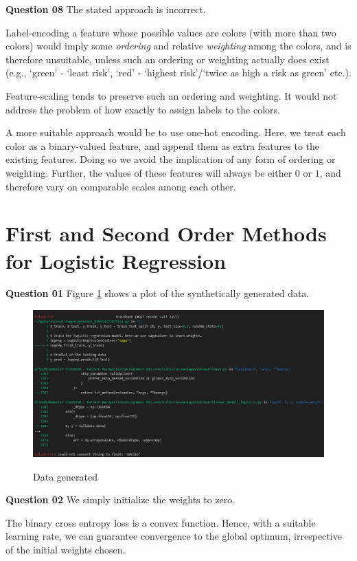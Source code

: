 \documentclass{article}[a4paper]
\begin{document}
	\textbf{Question 08} The stated approach is incorrect.
	
	Label-encoding a feature whose possible values are colors (with more than two colors) would imply some \textit{ordering} and relative \textit{weighting} among the colors, and is therefore unsuitable, unless such an ordering or weighting actually does exist (e.g., `green' - `least risk', `red' - `highest risk'/`twice as high a risk as green' etc.).
	
	Feature-scaling tends to preserve such an ordering and weighting. It would not address the problem of how exactly to assign labels to the colors.

	A more suitable approach would be to use one-hot encoding. Here, we treat each color as a binary-valued feature, and append them as extra features to the existing features. Doing so we avoid the implication of any form of ordering or weighting. Further, the values of these features will always be either $0$ or $1$, and therefore vary on comparable scales among each other.

	\section{First and Second Order Methods for Logistic Regression}

	\textbf{Question 01} Figure \ref{q3_1} shows a plot of the synthetically generated data.

	\begin{figure}[H]
		\centering
		\includegraphics[width=0.8\linewidth]{images/error.png}
		\label{q3_1}
		\caption{Data generated}
	\end{figure}

	\textbf{Question 02} We simply initialize the weights to zero.
	
	The binary cross entropy loss is a convex function. Hence, with a suitable learning rate, we can guarantee convergence to the global optimum, irrespective of the initial weights chosen.
	
\end{document}
